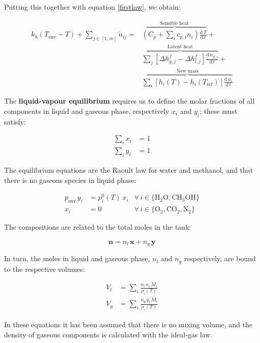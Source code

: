 \documentclass[a4paper]{article}
\renewcommand{\d}{\ensuremath{\mathrm{d}}}
\newcommand{\der}[2]{\ensuremath{\frac{\d \, #1}{\d \, #2}}}
\begin{document}
Putting this together with equation \ref{firstlaw}, we obtain:

\begin{equation}
\boxed{ \begin{aligned}
k_h ( T_\text{env} - T ) + \sum_{j \in [1, m]} \dot n_{ij} = &
\overbrace{\left ( C_p + \sum_i c_{p,i} n_i \right) \der{T}{t} }
^\text{Sensible heat} +\\
& \overbrace{\sum_j [ \Delta h _{g,j}^f - \Delta h _{l,j}^f ] \der{n_{g,j}}{t}}
^\text{Latent heat} +\\
& \overbrace{ \sum_i [ h_i(T) - h_i(T_\text{ref}) ] \der{n_i}{t} }
^\text{New mass}
\end{aligned} }
\end{equation}


The \textbf{liquid-vapour equilibrium} requires us to define the molar fractions
of all components in liquid and gaseous phase, respectively $x_i$ and $y_i$;
these must satisfy:

\begin{align}
\sum_i x_i &= 1\\
\sum_i y_i &= 1
\end{align}

The equilibrium equations are the Raoult law for water and methanol, and that
there is no gaseous species in liquid phase:

\begin{align}
p_\text{env} \, y_i &= p^0_i(T) \, x_i & \forall \, i \in \lbrace \mathrm{H_2O, CH_3OH} \rbrace\\
x_i &= 0 & \forall \, i \in \lbrace \mathrm{O_2, CO_2, N_2} \rbrace
\end{align}

The compositions are related to the total moles in the tank:

\begin{equation}
\mathbf{n} = n_l\,\mathbf{x} + n_g\,\mathbf{y}
\end{equation}

In turn, the moles in liquid and gaseous phase,  $n_l$ and $n_g$ respectively,
are bound to the respective volumes:

\begin{align}
V_l &= \sum_i \frac{n_l \, x_i \, M_i}{\rho_i(T)}\\
V_g &= \sum_i \frac{n_g \, y_i \, M_i}{\rho_i(T)}
\end{align}

In these equations it has been assumed that there is no mixing volume, and the
density of gaseous components is calculated with the ideal-gas law.
\end{document}
